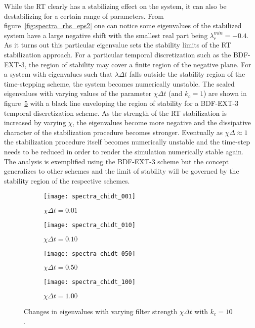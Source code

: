 While the RT clearly has a stabilizing effect on the system, it can also be destabilizing for a certain range of parameters. From figure~\ref{fig:spectra_rhs_eps2} one can notice some eigenvalues of the stabilized system have a large negative shift with the smallest real part being $\lambda_{r}^{min}=-0.4$. As it turns out this particular eigenvalue sets the stability limits of the RT stabilization approach. For a particular temporal discretization such as the BDF-EXT-3, the region of stability may cover a finite region of the negative plane. For a system with eigenvalues such that $\lambda\Delta t$ falls outside the stability region of the time-stepping scheme, the system becomes numerically unstable. The scaled eigenvalues with varying values of the parameter $\chi\Delta t$ (and $k_{c}=1$) are shown in figure~\ref{fig:rt_stability} with a black line enveloping the region of stability for a BDF-EXT-3 temporal discretization scheme. As the strength of the RT stabilization is increased by varying $\chi$, the eigenvalues become more negative and the dissipative character of the stabilization procedure becomes stronger. Eventually as $\chi\Delta \approx 1$ the stabilization procedure itself becomes numerically unstable and the time-step needs to be reduced in order to render the simulation numerically stable again. The analysis is exemplified using the BDF-EXT-3 scheme but the concept generalizes to other schemes and the limit of stability will be governed by the stability region of the respective schemes.
\begin{figure}[h]
	\centering
	\begin{subfigure}[b]{0.45\textwidth}
		\centering
		\texttt{[image: spectra\_chidt\_001]}
		\caption{$\chi\Delta t=0.01$}
		\label{fig:spectra_chidt001}
	\end{subfigure}
	\begin{subfigure}[b]{0.45\textwidth}
		\centering
		\texttt{[image: spectra\_chidt\_010]}
		\caption{$\chi\Delta t=0.10$}
		\label{fig:spectra_chidt01}
	\end{subfigure}
	\begin{subfigure}[b]{0.45\textwidth}
		\centering
		\texttt{[image: spectra\_chidt\_050]}
		\caption{$\chi\Delta t=0.50$}
		\label{fig:spectra_chidt050}
	\end{subfigure}
	\begin{subfigure}[b]{0.45\textwidth}
		\centering
		\texttt{[image: spectra\_chidt\_100]}
		\caption{$\chi\Delta t=1.00$}
		\label{fig:spectra_chidt100}
	\end{subfigure}	
	\caption{Changes in eigenvalues with varying filter strength $\chi\Delta t$ with $k_{c}=10$.}
	\label{fig:rt_stability}
\end{figure}

